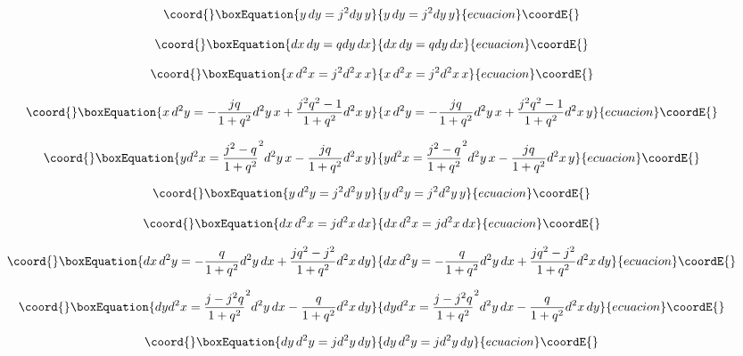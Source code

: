 \documentclass[a4paper,12pt,thmsa]{article}
\begin{document}
\begin{equation}\coord{}\boxEquation{
y\, dy=j^2dy\, y
}{
y\, dy=j^2dy\, y
}{ecuacion}\coordE{}\end{equation}

\begin{equation}\coord{}\boxEquation{
dx\, dy=qdy\, dx
}{
dx\, dy=qdy\, dx
}{ecuacion}\coordE{}\end{equation}

\begin{equation}\coord{}\boxEquation{
x\, d^{2}x=j^{2}d^{2}x\, x
}{
x\, d^{2}x=j^{2}d^{2}x\, x
}{ecuacion}\coordE{}\end{equation}

\begin{equation}\coord{}\boxEquation{
x\, d^{2}y=-\frac{jq}{1+q^{2}}d^{2}y\, x+\frac{j^{2}q^{2}-1}{
1+q^{2}}d^{2}x\, y
}{
x\, d^{2}y=-\frac{jq}{1+q^{2}}d^{2}y\, x+\frac{j^{2}q^{2}-1}{
1+q^{2}}d^{2}x\, y
}{ecuacion}\coordE{}\end{equation}

\begin{equation}\coord{}\boxEquation{
yd^2x=\frac{j^2-q}{1+q^2}^2d^2y\, x-\frac{jq}{1+q^2}d^2x\, y
}{
yd^2x=\frac{j^2-q}{1+q^2}^2d^2y\, x-\frac{jq}{1+q^2}d^2x\, y
}{ecuacion}\coordE{}\end{equation}

\begin{equation}\coord{}\boxEquation{
y\, d^2y=j^2d^2y\, y
}{
y\, d^2y=j^2d^2y\, y
}{ecuacion}\coordE{}\end{equation}

\begin{equation}\coord{}\boxEquation{
dx\, d^{2}x=jd^{2}x\, dx
}{
dx\, d^{2}x=jd^{2}x\, dx
}{ecuacion}\coordE{}\end{equation}

\begin{equation}\coord{}\boxEquation{
dx\, d^{2}y=-\frac{q}{1+q^{2}}d^{2}y\, dx+\frac{jq^{2}-j^{2}}{
1+q^{2}}d^{2}x\, dy
}{
dx\, d^{2}y=-\frac{q}{1+q^{2}}d^{2}y\, dx+\frac{jq^{2}-j^{2}}{
1+q^{2}}d^{2}x\, dy
}{ecuacion}\coordE{}\end{equation}

\begin{equation}\coord{}\boxEquation{
dyd^{2}x=\frac{j-j^{2}q}{1+q^{2}}^{2}d^{2}y\, dx-\frac{q}{1+q^{2}}d^{2}x
\, dy
}{
dyd^{2}x=\frac{j-j^{2}q}{1+q^{2}}^{2}d^{2}y\, dx-\frac{q}{1+q^{2}}d^{2}x
\, dy
}{ecuacion}\coordE{}\end{equation}

\begin{equation}\coord{}\boxEquation{
dy\, d^{2}y=jd^{2}y\, dy
}{
dy\, d^{2}y=jd^{2}y\, dy
}{ecuacion}\coordE{}\end{equation}
\end{document}
